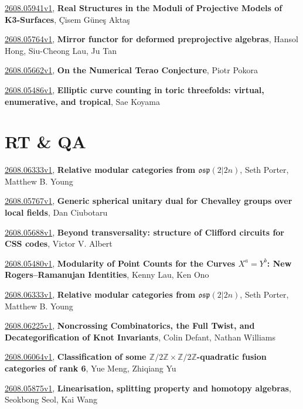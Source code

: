 \documentclass[9pt, a4paper]{article}
\theoremstyle{plain}
\theoremstyle{definition}
\theoremstyle{remark}
\newcommand{\arxiv}[3]{\href{https://arxiv.org/abs/#1}{#1}, \textbf{\textcolor{arxivblue}{#2}}, #3}
\begin{document}
\arxiv{2608.05941v1}{Real Structures in the Moduli of Projective Models of K3-Surfaces}{Çisem Güneş Aktaş}

\arxiv{2608.05764v1}{Mirror functor for deformed preprojective algebras}{Hansol Hong, Siu-Cheong Lau, Ju Tan}

\arxiv{2608.05662v1}{On the Numerical Terao Conjecture}{Piotr Pokora}

\arxiv{2608.05486v1}{Elliptic curve counting in toric threefolds: virtual, enumerative, and tropical}{Sae Koyama}


\section{RT \& QA}
\arxiv{2608.06333v1}{Relative modular categories from $\mathfrak{osp}(2 \vert 2n)$}{Seth Porter, Matthew B. Young}

\arxiv{2608.05767v1}{Generic spherical unitary dual for Chevalley groups over local fields}{Dan Ciubotaru}

\arxiv{2608.05688v1}{Beyond transversality: structure of Clifford circuits for CSS codes}{Victor V. Albert}

\arxiv{2608.05480v1}{Modularity of Point Counts for the Curves $X^a=Y^b$: New Rogers--Ramanujan Identities}{Kenny Lau, Ken Ono}

\arxiv{2608.06333v1}{Relative modular categories from $\mathfrak{osp}(2 \vert 2n)$}{Seth Porter, Matthew B. Young}

\arxiv{2608.06225v1}{Noncrossing Combinatorics, the Full Twist, and Decategorification of Knot Invariants}{Colin Defant, Nathan Williams}

\arxiv{2608.06064v1}{Classification of some $\mathbb{Z}/2\mathbb{Z}\times \mathbb{Z}/2\mathbb{Z}$-quadratic fusion categories of rank 6}{Yue Meng, Zhiqiang Yu}

\arxiv{2608.05875v1}{Linearisation, splitting property and homotopy algebras}{Seokbong Seol, Kai Wang}

\end{document}
